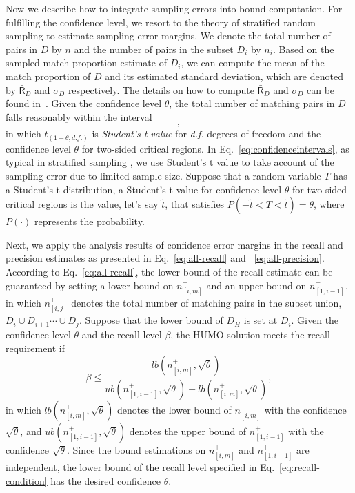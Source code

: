   Now we describe how to integrate sampling errors into bound computation. For fulfilling the confidence level, we resort to the theory of stratified random sampling \cite{cochran1977sampling} to estimate sampling error margins. We denote the total number of pairs in $D$ by $n$ and the number of pairs in the subset $D_i$ by $n_i$. Based on the sampled match proportion estimate of $D_i$, we can compute the mean of the match proportion of $D$ and its estimated standard deviation, which are denoted by ${\bar{\mathsf{R}}_D}$ and $\sigma_D$ respectively. The details on how to compute ${\bar{\mathsf{R}}_D}$ and $\sigma_D$ can be found in~\cite{chen2017humoreport}. Given the confidence level $\theta$, the total number of matching pairs in $D$ falls reasonably within the interval
\begin{equation}
  [n\cdot(\bar{\mathsf{R}}_D-t_{(1-\theta, d.f.)}\cdot\sigma_{D}), n\cdot(\bar{\mathsf{R}}_D+t_{(1-\theta, d.f.)}\cdot\sigma_{D})],
\label{eq:confidenceintervals}
\end{equation}
in which $t_{(1-\theta, d.f.)}$ is {\em Student's t value} for {\em d.f.} degrees of freedom and the confidence level $\theta$ for two-sided critical regions. In Eq.~\ref{eq:confidenceintervals}, as typical in stratified sampling \cite{cochran1977sampling}, we use Student's t value to take account of the sampling error due to limited sample size. Suppose that a random variable $T$ has a Student's t-distribution, a Student's t value for confidence level $\theta$ for two-sided critical regions is the value, let's say $\tilde{t}$, that satisfies $P(-\tilde{t} < T < \tilde{t})=\theta$, where $P(\cdot)$ represents the probability.

  Next, we apply the analysis results of confidence error margins in the recall and precision estimates as presented in Eq.~\ref{eq:all-recall} and ~\ref{eq:all-precision}. According to Eq.~\ref{eq:all-recall}, the lower bound of the recall estimate can be guaranteed by setting a lower bound on $n_{[i,m]}^{+}$ and an upper bound on $n_{[1,i-1]}^{+}$, in which $n_{[i,j]}^{+}$ denotes the total number of matching pairs in the subset union, $D_i\cup D_{i+1}\cdots\cup D_j$. Suppose that the lower bound of $D_H$ is set at $D_i$. Given the confidence level $\theta$ and the recall level $\beta$, the HUMO solution meets the recall requirement if
\begin{equation}
\label{eq:recall-condition}
  \beta\leq \frac{lb(n_{[i,m]}^{+}, \sqrt{\theta})}{ub(n_{[1,i-1]}^{+}, \sqrt{\theta}) + lb(n_{[i,m]}^{+}, \sqrt{\theta})},
\end{equation}
in which $lb(n_{[i,m]}^{+}, \sqrt{\theta})$ denotes the lower bound of $n_{[i,m]}^{+}$ with the confidence $\sqrt{\theta}$, and $ub(n_{[1,i-1]}^{+}, \sqrt{\theta})$ denotes the upper bound of $n_{[1,i-1]}^{+}$ with the confidence $\sqrt{\theta}$. Since the bound estimations on $n_{[i,m]}^{+}$ and $n_{[1,i-1]}^{+}$ are independent, the lower bound of the recall level specified in Eq.~\ref{eq:recall-condition} has the desired confidence $\theta$.

